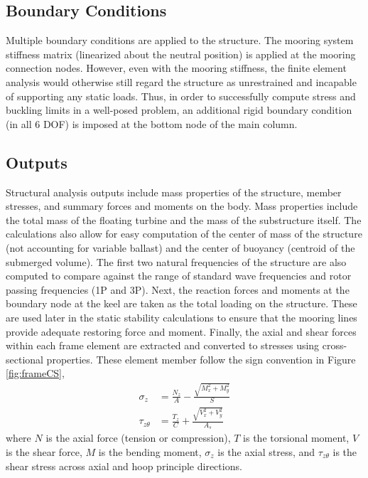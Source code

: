 \subsection{Boundary Conditions}
Multiple boundary conditions are applied to the structure.  The mooring
system stiffness matrix (linearized about the neutral position) is
applied at the mooring connection nodes.  However, even with the mooring
stiffness, the finite element analysis would otherwise still regard the
structure as unrestrained and incapable of supporting any static loads.
Thus, in order to successfully compute stress and buckling limits in a
well-posed problem, an additional rigid boundary condition (in all 6
DOF) is imposed at the bottom node of the main column.

\subsection{Outputs}
Structural analysis outputs include mass properties of the structure,
member stresses, and summary forces and moments on the body.  Mass
properties include the total mass of the floating turbine and the mass
of the substructure itself.  The calculations also allow for easy
computation of the center of mass of the structure (not accounting for
variable ballast) and the center of buoyancy (centroid of the submerged
volume).  The first two natural frequencies of the structure are also
computed to compare against the range of standard wave frequencies and
rotor passing frequencies (1P and 3P).  Next, the reaction forces and
moments at the boundary node at the keel are taken as the total loading
on the structure.  These are used later in the static stability
calculations to ensure that the mooring lines provide adequate restoring
force and moment.  Finally, the axial and shear forces within each frame
element are extracted and converted to stresses using cross-sectional
properties. These element member follow the sign convention in Figure
\ref{fig:frameCS},
\begin{align*}
  \sigma_z &= \frac{N_z}{A} - \frac{\sqrt{M_x^2 + M_y^2}}{S}\\
  \tau_{z\theta} &= \frac{T_z}{C} + \frac{\sqrt{V_x^2 + V_y^2}}{A_s}
\end{align*}
where $N$ is the axial force (tension or compression), $T$ is the
torsional moment, $V$ is the shear force, $M$ is the bending moment,
$\sigma_z$ is the axial stress, and $\tau_{z\theta}$ is the shear
stress across axial and hoop principle directions.

